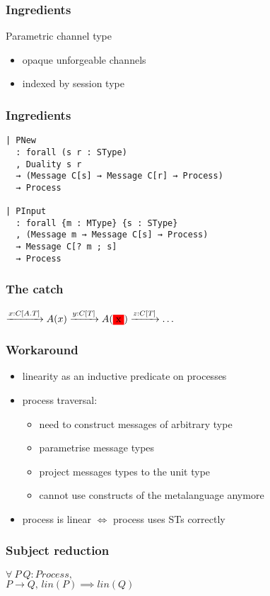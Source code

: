 \documentclass{beamer}
\begin{document}
\begin{frame}
    \frametitle{Ingredients}
    \begin{block}{Parametric channel type}
        \begin{itemize}
            \item opaque unforgeable channels
            \item indexed by session type
        \end{itemize}
    \end{block}
\end{frame}

\begin{frame}[fragile]
    \frametitle{Ingredients}
    \begin{verbatim}
| PNew
  : forall (s r : SType)
  , Duality s r
  → (Message C[s] → Message C[r] → Process)
  → Process

| PInput
  : forall {m : MType} {s : SType}
  , (Message m → Message C[s] → Process)
  → Message C[? m ; s]
  → Process
    \end{verbatim}

\end{frame}

\begin{frame}
    \frametitle{The catch}
    \centering
    \LARGE
    $
    \xrightarrow{x : C[A.T]} A(x)
    \xrightarrow{y : C[T]} A(\colorbox{red}{x})
    \xrightarrow{z : C[T]} \ldots$
\end{frame}

\begin{frame}
    \frametitle{Workaround}
    \begin{itemize}
        \item linearity as an inductive predicate on processes
        \item process traversal:
            \begin{itemize}
                \item need to construct messages of arbitrary type
                \item parametrise message types
                \item project messages types to the unit type
                \item cannot use constructs of the metalanguage anymore
            \end{itemize}
        \item process is linear $\iff$ process uses STs correctly
    \end{itemize}
\end{frame}

\begin{frame}
    \frametitle{Subject reduction}
    \LARGE
    \centering
    $\forall \ P \ Q : Process,$\\
    $P \rightarrow Q, \, lin(P) \implies lin(Q)$ \\
\end{frame}
\end{document}
